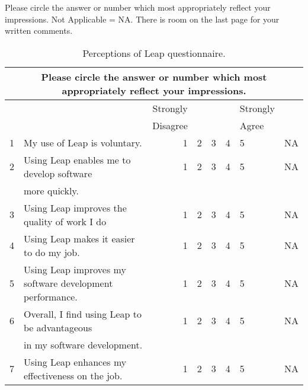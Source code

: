 
\label{sec:perceptions-questionnaire}

Please circle the answer or number which most appropriately reflect your
impressions.  Not Applicable = NA.   There is room on the last page for your
written comments.\\
\begin{table}[htbp]
  \caption{Perceptions of Leap questionnaire.}  
  \begin{tabular}{rlrccclc}\\
    \multicolumn{8}{c}{Please circle the answer or number which most
    appropriately reflect your impressions. } \\
    \hline
    \hline
    &&Strongly&&&&Strongly&\\ 
    &&Disagree&&&&Agree&\\ \hline
    1&My use of Leap is voluntary.&1&2&3&4&5&NA\\ \hline
    2&Using Leap enables me to develop software&1&2&3&4&5&NA\\
    &more quickly.\\ \hline
    3&Using Leap improves the quality of work I do&1&2&3&4&5&NA\\ \hline
    4&Using Leap makes it easier to do my job.&1&2&3&4&5&NA\\ \hline
    5&Using Leap improves my software development performance.&1&2&3&4&5&NA\\ \hline
    6&Overall, I find using Leap to be advantageous&1&2&3&4&5&NA\\
    &in my software development.\\ \hline
    7&Using Leap enhances my effectiveness on the job.&1&2&3&4&5&NA\\ \hline

\end{tabular}
\end{table}
